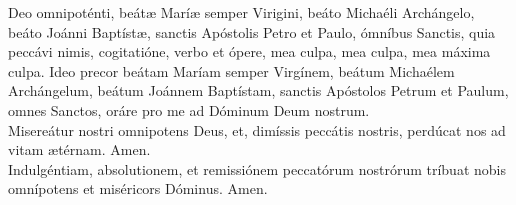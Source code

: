 Deo omnipoténti, beát{\ae} Marí{\ae} semper Virigini, beáto Michaéli Archángelo, beáto Joánni Baptíst{\ae}, sanctis 
Apóstolis Petro et Paulo, ómníbus Sanctis, quia peccávi nimis, cogitatióne, verbo et ópere, mea culpa, mea culpa, mea máxima culpa. Ideo precor beátam
Maríam semper Virgínem, beátum Michaélem Archángelum, beátum Joánnem Baptístam, sanctis Apóstolos Petrum et Paulum, omnes Sanctos,
oráre pro me ad Dóminum Deum nostrum.\\
Misereátur nostri omnipotens Deus, et, dimíssis peccátis nostris, perdúcat nos ad vitam {\ae}térnam. Amen.\\
Indulgéntiam, absolutionem, et remissiónem peccatórum nostrórum tríbuat nobis omnípotens et miséricors Dóminus. Amen.